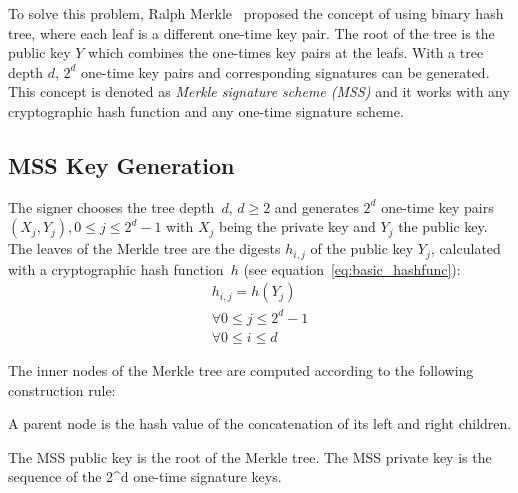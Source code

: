 To solve this problem, Ralph Merkle~\cite{cha:bg_merkletrees_Merkle_1979} proposed the concept of using binary hash tree, where each leaf is a different one-time key pair. The root of the tree is the public key $Y$  which combines the one-times key pairs at the leafs. With a tree depth $d$, $2^d$ one-time key pairs and corresponding signatures can be generated. %
This concept is denoted as \textit{Merkle signature scheme (MSS)} and it works with any cryptographic hash function and any one-time signature scheme. %


\subsection{MSS Key Generation}
The signer chooses the tree depth~$d$, $d \geq 2$ and generates $2^d$ one-time key pairs $(X_j, Y_j), 0 \leq j \leq 2^d-1$ with $X_j$ being the private key and $Y_j$ the public key. The leaves of the Merkle tree are the digests $h_{i,j}$ of the public key $Y_j$, calculated with a cryptographic hash function~$h$ (see equation~\ref{eq:basic_hashfunc}):
\begin{gather}
\label{eq:leaf_merkle_tree:hash_digest_publ_key_Y}
h_{i,j} = h(Y_j) \\
\forall 0 \leq j \leq 2^d - 1 \nonumber \\ 
\forall 0 \leq i \leq d \nonumber
\end{gather}

The inner nodes of the Merkle tree are computed according to the following construction rule: 

A parent node is the hash value of the concatenation of its left and right children.

The MSS public key is the root of the Merkle tree. The MSS private key is the sequence of the 2^d one-time signature keys.

